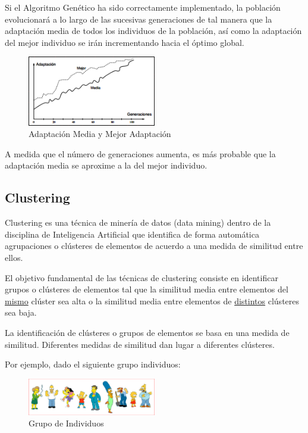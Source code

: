 \documentclass[a4paper, 11pt]{article} %
\begin{document}
Si el Algoritmo Genético ha sido correctamente implementado, la población evolucionará a lo largo de las sucesivas generaciones de tal manera que la adaptación
media de todos los individuos de la población, así como la adaptación del mejor individuo
se irán incrementando hacia el óptimo global.

\begin{figure}[H]
\centering
\includegraphics[width=0.5\textwidth]{Adaptacion.PNG}
\caption{Adaptación Media y Mejor Adaptación}
\label{Adaptación Media y Mejor Adaptación}
\end{figure}

A medida que el número de generaciones aumenta, es más probable que la
adaptación media se aproxime a la del mejor individuo.



\subsection{Clustering}
Clustering es una técnica de minería de datos (data mining) dentro de la disciplina de Inteligencia Artificial que identifica de forma automática agrupaciones o clústeres de elementos de acuerdo a una medida de similitud entre ellos.

El objetivo fundamental de las técnicas de clustering consiste en identificar grupos o clústeres de elementos tal que la similitud media entre elementos del \underline{mismo} clúster sea alta o la similitud media entre elementos de \underline{distintos} clústeres sea baja.

La identificación de clústeres o grupos de elementos se basa en una medida de similitud. Diferentes medidas de similitud dan lugar a diferentes clústeres.

Por ejemplo, dado el siguiente grupo individuos:

\begin{figure}[H]
\centering
\includegraphics[width=0.5\textwidth]{GrupoSimpson.PNG}
\caption{Grupo de Individuos}
\label{Grupo de Individuos}
\end{figure}
\end{document}
